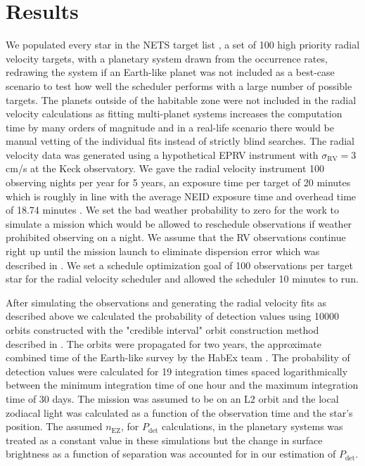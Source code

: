 \section{Results}

We populated every star in the NETS target list
\citep{guptaTargetPrioritization2021}, a set of 100 high priority radial
velocity targets, with a planetary system drawn from the
\citet{dulzJointRadialVelocity2020} occurrence rates, redrawing the system if
an Earth-like planet was not included as a best-case scenario to test how well
the scheduler performs with a large number of possible targets. The planets
outside of the habitable zone were not included in the radial velocity
calculations as fitting multi-planet systems increases the computation time by
many orders of magnitude and in a real-life scenario there would be manual
vetting of the individual fits instead of strictly blind searches. The radial
velocity data was generated using a hypothetical EPRV instrument with
$\sigma_\textrm{RV} = 3$ cm/s at the Keck observatory. We gave the radial
velocity instrument 100 observing nights per year for 5 years, an exposure time
per target of 20 minutes which is roughly in line with the average NEID
exposure time and overhead time of 18.74 minutes
\citep{guptaTargetPrioritization2021}. We set the bad weather probability to
zero for the work to simulate a mission which would be allowed to reschedule
observations if weather prohibited observing on a night. We assume that the RV
observations continue right up until the mission launch to eliminate dispersion
error which was described in . We set a schedule
optimization goal of 100 observations per target star for the radial velocity
scheduler and allowed the scheduler 10 minutes to run.

After simulating the observations and generating the radial velocity fits as
described above we calculated the probability of detection values using 10000
orbits constructed with the "credible interval" orbit construction method
described in . The orbits were propagated for two years,
the approximate combined time of the Earth-like survey by the HabEx team
\citep{gaudiHabitableExoplanetObservatory2020}. The probability of detection
values were calculated for 19 integration times spaced logarithmically between
the minimum integration time of one hour and the maximum integration time of 30
days. The mission was assumed to be on an L2 orbit and the local zodiacal light
was calculated as a function of the observation time and the star's position.
The assumed $n_\textrm{EZ}$, for $P_\textrm{det}$ calculations, in the
planetary systems was treated as a constant value in these simulations but the
change in surface brightness as a function of separation was accounted for in
our estimation of $P_\textrm{det}$.

